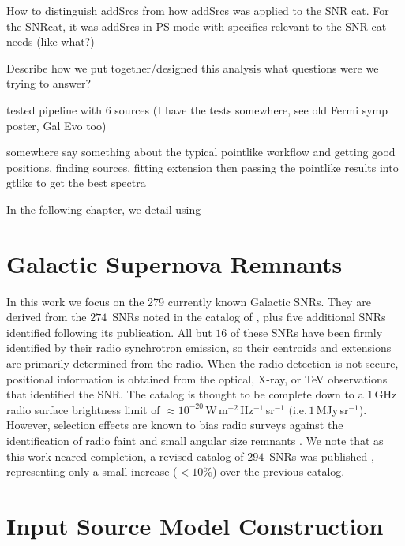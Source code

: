 {How to distinguish addSrcs from how addSrcs was applied to the SNR cat. For the SNRcat, it was addSrcs in PS mode with specifics relevant to the SNR cat needs (like what?)


Describe how we put together/designed this analysis what questions were we trying to answer?


tested pipeline with 6 sources (I have the tests somewhere, see old Fermi symp poster, Gal Evo too)

somewhere say something about the typical pointlike workflow and getting good positions, finding sources, fitting extension then passing the pointlike results into gtlike to get the best spectra

In the following chapter, we detail using \srcs{} 

\section{Galactic Supernova Remnants}\label{snrCat:radSNRs}

In this work we focus on the 279 currently known Galactic SNRs. They are derived from the $274$~SNRs noted in the catalog of \citet[hereafter Green's catalog]{Green09}, plus five additional SNRs identified following its publication. %
All but $16$ of these SNRs have been firmly identified by their radio synchrotron emission, so their centroids and extensions are primarily determined from the radio. %
When the radio detection is not secure, positional information is obtained from the optical, X-ray, or TeV observations that identified the SNR. The catalog is thought to be complete down to a $1$\,GHz radio surface brightness limit of $\approx 10^{-20}$\,W\,m$^{-2}$\,Hz$^{-1}$\,sr$^{-1}$ (i.e.\,$1$\,MJy\,sr$^{-1}$). %
However, selection effects are known to bias radio surveys against the identification of radio faint and small angular size remnants \citep{Green04,Brogan06}. 
We note that as this work neared completion, a revised catalog of $294$~SNRs was published \citep{Green14}, representing only a small increase ($<10\%$) over the previous catalog.

\section{Input Source Model Construction}\label{snrCat:AddSrcs}

}
